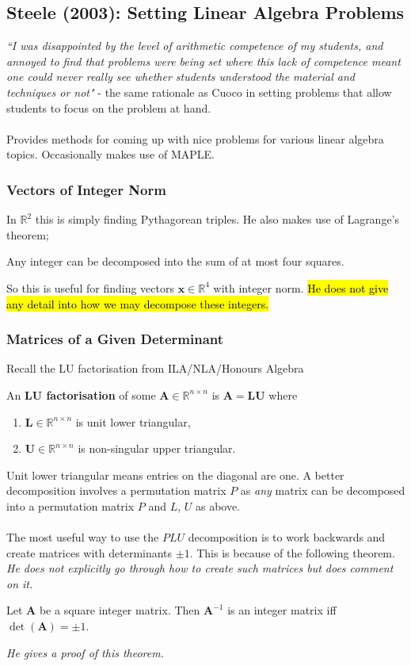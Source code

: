 \documentclass[12pt]{article}
\newcommand{\R}{\mathbb{R}}
\begin{document}
\subsection{Steele (2003): Setting Linear Algebra Problems}
\textit{``I was disappointed by the level of arithmetic competence of my students, and annoyed to find that problems were being set where this lack of competence meant one could never really see whether students understood the material and techniques or not"} - the same rationale as Cuoco in setting problems that allow students to focus on the problem at hand.\\\\
Provides methods for coming up with nice problems for various linear algebra topics. Occasionally makes use of MAPLE.

\subsubsection{Vectors of Integer Norm}
In $\R^2$ this is simply finding Pythagorean triples. He also makes use of Lagrange's theorem;
\begin{thm}{}{}
Any integer can be decomposed into the sum of at most four squares.
\end{thm}
So this is useful for finding vectors $\bm{x} \in \R^4$ with integer norm. \hl{He does not give any detail into how we may decompose these integers.}

\subsubsection{Matrices of a Given Determinant}
Recall the LU factorisation from ILA/NLA/Honours Algebra
\begin{dfn}{}{}
An \textbf{LU factorisation} of some $\bm{A} \in \R^{n\times n}$ is $\bm{A} = \bm{LU}$ where
\begin{enumerate}[itemsep=-2mm]
    \item $\bm{L} \in \R^{n \times n}$ is unit lower triangular,
    \item $\bm{U} \in \R^{n \times n}$ is non-singular upper triangular.
\end{enumerate}
\end{dfn}
Unit lower triangular means entries on the diagonal are one. A better decomposition involves a permutation matrix $P$ as \textit{any} matrix can be decomposed into a permutation matrix $P$ and $L$, $U$ as above.\\\\
The most useful way to use the $PLU$ decomposition is to work backwards and create matrices with determinants $\pm1$. This is because of the following theorem. \textit{He does not explicitly go through how to create such matrices but does comment on it.}
\begin{thm}{}{}
Let $\mathbf{A}$ be a square integer matrix. Then $\mathbf{A}^{-1}$ is an integer matrix iff $\det(\mathbf{A}) = \pm1$.
\end{thm}
\textit{He gives a proof of this theorem.}
\end{document}
